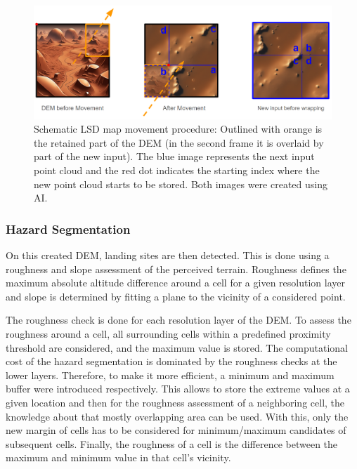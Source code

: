 \begin{figure}[ht!]
    \centering
    \includegraphics[scale=0.25]{images/system_overview/map_movement.png}
    \caption{Schematic LSD map movement procedure: Outlined with orange is the retained part of the DEM (in the second frame it is overlaid by part of the new input). The blue image represents the next input point cloud and the red dot indicates the starting index where the new point cloud starts to be stored. Both images were created using AI.}
    \label{fig:map_movement}
\end{figure}


\subsubsection{Hazard Segmentation}\label{subsubsec:setup:haz_seg}

On this created DEM, landing sites are then detected. This is done using a roughness and slope assessment of the perceived terrain. Roughness defines the maximum absolute altitude difference around a cell for a given resolution layer and slope is determined by fitting a plane to the vicinity of a considered point.

The roughness check is done for each resolution layer of the DEM. To assess the roughness around a cell, all surrounding cells within a predefined proximity threshold are considered, and the maximum value is stored. The computational cost of the hazard segmentation is dominated by the roughness checks at the lower layers. Therefore, to make it more efficient, a minimum and maximum buffer were introduced respectively. This allows to store the extreme values at a given location and then for the roughness assessment of a neighboring cell, the knowledge about that mostly overlapping area can be used. With this, only the new margin of cells has to be considered for minimum/maximum candidates of subsequent cells. Finally, the roughness of a cell is the difference between the maximum and minimum value in that cell's vicinity.

